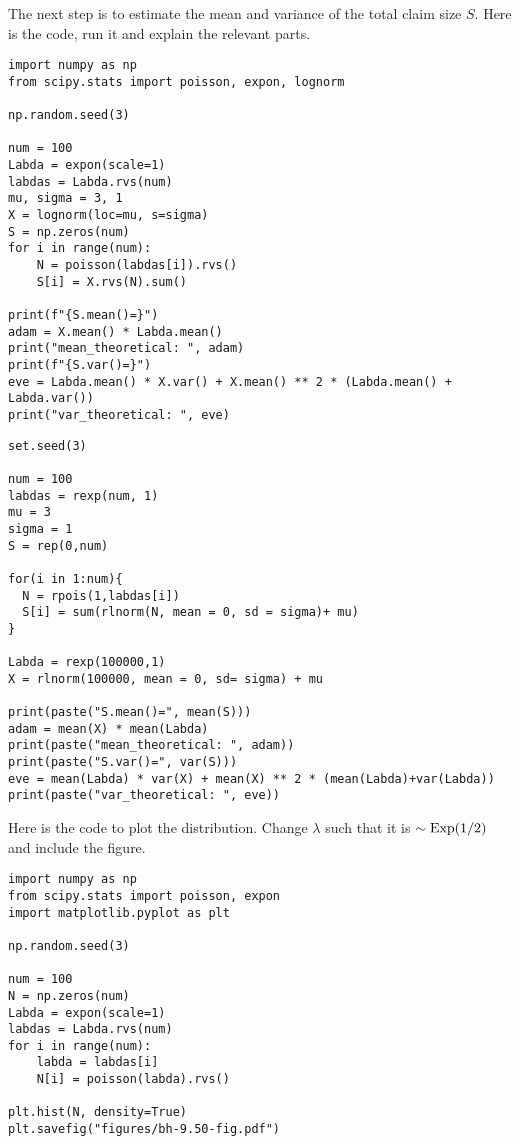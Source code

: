 \begin{exercise}
The next step is to estimate the mean and variance of the total claim size $S$.
Here is the code, run it and explain the relevant parts.
\begin{verbatim}
import numpy as np
from scipy.stats import poisson, expon, lognorm

np.random.seed(3)

num = 100
Labda = expon(scale=1)
labdas = Labda.rvs(num)
mu, sigma = 3, 1
X = lognorm(loc=mu, s=sigma)
S = np.zeros(num)
for i in range(num):
    N = poisson(labdas[i]).rvs()
    S[i] = X.rvs(N).sum()

print(f"{S.mean()=}")
adam = X.mean() * Labda.mean()
print("mean_theoretical: ", adam)
print(f"{S.var()=}")
eve = Labda.mean() * X.var() + X.mean() ** 2 * (Labda.mean() + Labda.var())
print("var_theoretical: ", eve)
\end{verbatim}
\end{exercise}

\begin{verbatim}
set.seed(3)

num = 100
labdas = rexp(num, 1) 
mu = 3
sigma = 1
S = rep(0,num)

for(i in 1:num){
  N = rpois(1,labdas[i])
  S[i] = sum(rlnorm(N, mean = 0, sd = sigma)+ mu)
}

Labda = rexp(100000,1)
X = rlnorm(100000, mean = 0, sd= sigma) + mu

print(paste("S.mean()=", mean(S)))
adam = mean(X) * mean(Labda)
print(paste("mean_theoretical: ", adam))
print(paste("S.var()=", var(S)))
eve = mean(Labda) * var(X) + mean(X) ** 2 * (mean(Labda)+var(Labda))
print(paste("var_theoretical: ", eve))
\end{verbatim}

\begin{exercise}
Here is the code to plot the distribution. Change $\lambda$ such that it is $\sim\mathrm{Exp}(1/2)$ and include the figure.
\begin{verbatim}
import numpy as np
from scipy.stats import poisson, expon
import matplotlib.pyplot as plt

np.random.seed(3)

num = 100
N = np.zeros(num)
Labda = expon(scale=1)
labdas = Labda.rvs(num)
for i in range(num):
    labda = labdas[i]
    N[i] = poisson(labda).rvs()

plt.hist(N, density=True)
plt.savefig("figures/bh-9.50-fig.pdf")
\end{verbatim}
\end{exercise}

